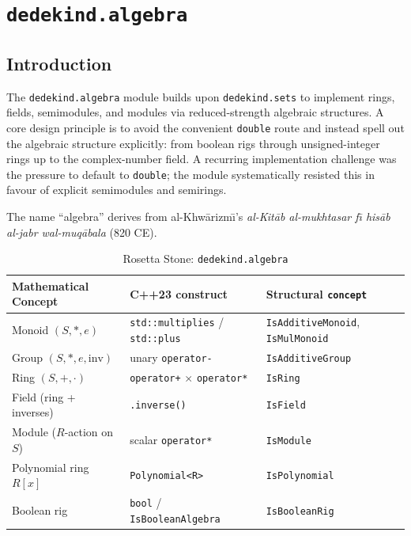 \documentclass[11pt, a4paper]{report}
\begin{document}
\chapter{\texttt{dedekind.algebra}}
\label{chap:algebra}

\section{Introduction}

The \texttt{dedekind.algebra} module builds upon \texttt{dedekind.sets} to implement rings, fields, semimodules, and modules via reduced-strength algebraic structures.
A core design principle is to avoid the convenient \texttt{double} route and instead spell out the algebraic structure explicitly: from boolean rigs through unsigned-integer rings up to the complex-number field.
A recurring implementation challenge was the pressure to default to \texttt{double}; the module systematically resisted this in favour of explicit semimodules and semirings.

The name ``algebra'' derives from al-Khw\={a}rizm\=\i{}'s \emph{al-Kit\={a}b al-mukhtasar f\=\i{} his\={a}b al-jabr wal-muq\={a}bala} (820 CE).

\begin{table}[ht]
\centering
\caption{Rosetta Stone: \texttt{dedekind.algebra}}
\label{table:algebra}
\begin{tabular}{lll}
\toprule
\textbf{Mathematical Concept} & \textbf{C++23 construct} & \textbf{Structural \texttt{concept}} \\
\midrule
Monoid $(S, *, e)$ & \texttt{std::multiplies} / \texttt{std::plus} & \texttt{IsAdditiveMonoid}, \texttt{IsMulMonoid} \\
Group $(S, *, e, \mathrm{inv})$ & unary \texttt{operator-} & \texttt{IsAdditiveGroup} \\
Ring $(S, +, \cdot)$ & \texttt{operator+} $\times$ \texttt{operator*} & \texttt{IsRing} \\
Field (ring + inverses) & \texttt{.inverse()} & \texttt{IsField} \\
Module ($R$-action on $S$) & scalar \texttt{operator*} & \texttt{IsModule} \\
Polynomial ring $R[x]$ & \texttt{Polynomial<R>} & \texttt{IsPolynomial} \\
Boolean rig & \texttt{bool} / \texttt{IsBooleanAlgebra} & \texttt{IsBooleanRig} \\
\bottomrule
\end{tabular}
\end{table}
\end{document}
